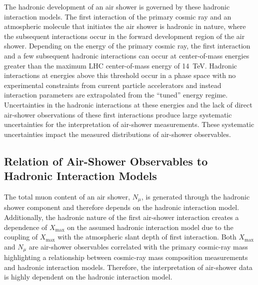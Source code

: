 The hadronic development of an air shower is governed by these hadronic interaction models.
The first interaction of the primary cosmic ray and an atmospheric molecule that initiates the air shower is hadronic in nature, where the subsequent interactions occur in the forward development region of the air shower.
Depending on the energy of the primary cosmic ray, the first interaction and a few subsequent hadronic interactions can occur at center-of-mass energies greater than the maximum LHC center-of-mass energy of \qty{14}{\tera\electronvolt}.
Hadronic interactions at energies above this threshold occur in a phase space with no experimental constraints from current particle accelerators and instead interaction parameters are extrapolated from the ``tuned'' energy regime.
Uncertainties in the hadronic interactions at these energies and the lack of direct air-shower observations of these first interactions produce large systematic uncertainties for the interpretation of air-shower measurements.
These systematic uncertainties impact the measured distributions of air-shower observables.

\subsection{Relation of Air-Shower Observables to Hadronic Interaction Models}\label{ssec:model_dependence}
The total muon content of an air shower, $N_{\mu}$, is generated through the hadronic shower component and therefore depends on the hadronic interaction model.
Additionally, the hadronic nature of the first air-shower interaction creates a dependence of $X_{\text{max}}$ on the assumed hadronic interaction model due to the coupling of $X_{\text{max}}$ with the atmospheric slant depth of first interaction.
Both $X_{\text{max}}$ and $N_{\mu}$ are air-shower observables correlated with the primary cosmic-ray mass highlighting a relationship between cosmic-ray mass composition measurements and hadronic interaction models.
Therefore, the interpretation of air-shower data is highly dependent on the hadronic interaction model.

